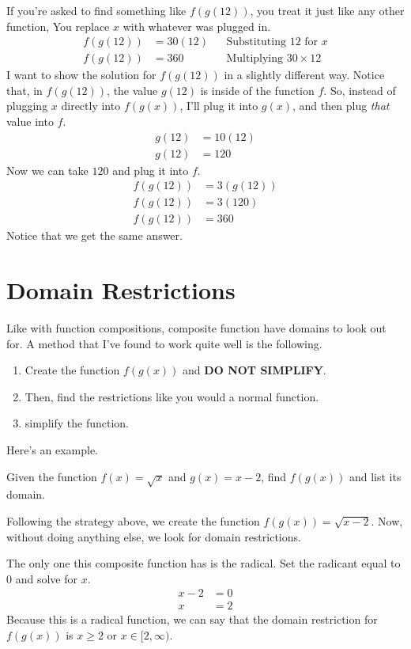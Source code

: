 If you're asked to find something like $f(g(12))$, you treat it just like any other function, You replace $x$ with whatever was plugged in.
\begin{align*}
    f(g(12)) &= 30(12) && \text{Substituting $12$ for $x$} \\
    f(g(12)) &= 360 && \text{Multiplying $30 \times 12$}
\end{align*}
I want to show the solution for $f(g(12))$ in a slightly different way. Notice that, in $f(g(12))$, the value $g(12)$ is inside of the function $f$. So, instead of plugging $x$ directly into $f(g(x))$, I'll plug it into $g(x)$, and then plug \textit{that} value into $f$.
\begin{align*}
    g(12) &= 10(12) \\
    g(12) &= 120
\end{align*}
Now we can take $120$ and plug it into $f$.
\begin{align*}
    f(g(12)) &= 3(g(12)) \\
    f(g(12)) &= 3(120) \\
    f(g(12)) &= 360
\end{align*}
Notice that we get the same answer.
\clearpage\section{Domain Restrictions}
Like with function compositions, composite function have domains to look out for. A method that I've found to work quite well is the following.
\begin{enumerate}
    \item Create the function $f(g(x))$ and \textbf{DO NOT SIMPLIFY}.
    \item Then, find the restrictions like you would a normal function.
    \item simplify the function.
\end{enumerate}
Here's an example.

Given the function $f(x) = \sqrt{x}$ and $g(x) = x - 2$, find $f(g(x))$ and list its domain.

Following the strategy above, we create the function $f(g(x)) = \sqrt{x - 2}$. Now, without doing anything else, we look for domain restrictions. 

The only one this composite function has is the radical. Set the radicant equal to $0$ and solve for $x$.
\vspace*{-0.5cm}
\begin{align*}
x - 2 &= 0 \\
x &= 2
\end{align*}
Because this is a radical function, we can say that the domain restriction for $f(g(x))$ is $x \ge 2$ or $x \in [2, \infty)$.

